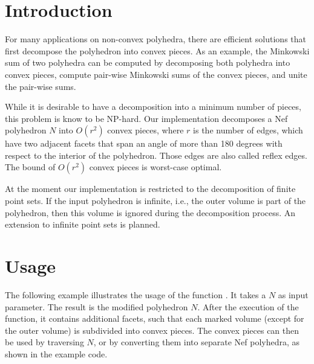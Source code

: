 
\ccParDims


%

\section{Introduction}

For many applications on non-convex polyhedra, there are efficient
solutions that first decompose the polyhedron into convex pieces. As
an example, the Minkowski sum of two polyhedra can be computed by
decomposing both polyhedra into convex pieces, compute pair-wise
Minkowski sums of the convex pieces, and unite the pair-wise sums.

While it is desirable to have a decomposition into a minimum number of
pieces, this problem is know to be NP-hard. Our implementation
decomposes a Nef polyhedron $N$ into $O(r^2)$ convex pieces, where $r$
is the number of edges, which have two adjacent facets that span an
angle of more than 180 degrees with respect to the interior of the
polyhedron. Those edges are also called reflex edges.  The bound of
$O(r^2)$ convex pieces is worst-case optimal.

At the moment our implementation is restricted to the decomposition of
finite point sets. If the input polyhedron is infinite, i.e., the
outer volume is part of the polyhedron, then this volume is ignored
during the decomposition process. An extension to infinite point sets
is planned.

\section{Usage}

The following example illustrates the usage of the function
. It takes a 
$N$ as input parameter. The result is the modified polyhedron $N$.
After the execution of the function, it contains additional facets,
such that each marked volume (except for the outer volume) is
subdivided into convex pieces. The convex pieces can then be used by
traversing $N$, or by converting them into separate Nef polyhedra, as
shown in the example code.

